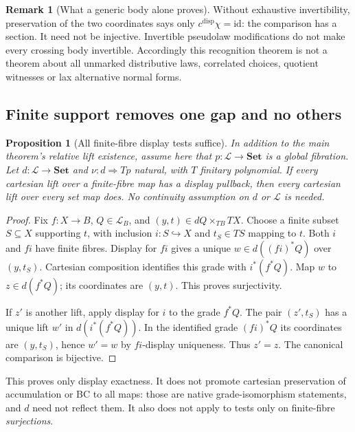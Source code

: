 \documentclass[11pt,a4paper]{article}
\newtheorem{proposition}[theorem]{Proposition}
\theoremstyle{definition}
\newtheorem{remark}[theorem]{Remark}
\newcommand{\Set}{\mathbf{Set}}
\newcommand{\Lcat}{\mathcal L}
\newcommand{\id}{\mathrm{id}}
\begin{document}
\begin{remark}[What a generic body alone proves]
Without exhaustive invertibility, preservation of the two coordinates says
only $c^{\mathrm{disp}}\chi=\id$: the comparison has a section. It need not
be injective. Invertible pseudolaw modifications do not make every crossing
body invertible. Accordingly this recognition theorem is not a theorem about
all unmarked distributive laws, correlated choices, quotient witnesses or
lax alternative normal forms.
\end{remark}

\subsection{Finite support removes one gap and no others}
\begin{proposition}[All finite-fibre display tests suffice]\label{prop:finitesupport}
In addition to the main theorem's relative lift existence, assume here that
$p:\Lcat\to\Set$ is a global fibration. Let $d:\Lcat\to\Set$ and
$\nu:d\Rightarrow Tp$ natural, with $T$ finitary polynomial. If every
cartesian lift over a finite-fibre map has a display pullback, then every
cartesian lift over every set map does. No continuity assumption on $d$ or
$\Lcat$ is needed.
\end{proposition}
\begin{proof}
Fix $f:X\to B$, $Q\in\Lcat_B$, and
$(y,t)\in dQ\times_{TB}TX$. Choose a finite subset $S\subseteq X$ supporting
$t$, with inclusion $i:S\hookrightarrow X$ and $t_S\in TS$ mapping to $t$.
Both $i$ and $fi$ have finite fibres. Display for $fi$ gives a unique
$w\in d((fi)^*Q)$ over $(y,t_S)$. Cartesian composition identifies this grade
with $i^*(f^*Q)$. Map $w$ to $z\in d(f^*Q)$; its coordinates are $(y,t)$.
This proves surjectivity.

If $z'$ is another lift, apply display for $i$ to the grade $f^*Q$. The pair
$(z',t_S)$ has a unique lift $w'$ in $d(i^*(f^*Q))$. In the identified grade
$(fi)^*Q$ its coordinates are $(y,t_S)$, hence $w'=w$ by $fi$-display
uniqueness. Thus $z'=z$. The canonical comparison is bijective.
\end{proof}
This proves only display exactness. It does not promote cartesian preservation
of accumulation or BC to all maps: those are native grade-isomorphism
statements, and $d$ need not reflect them. It also does not apply to tests only
on finite-fibre \emph{surjections}.
\end{document}
